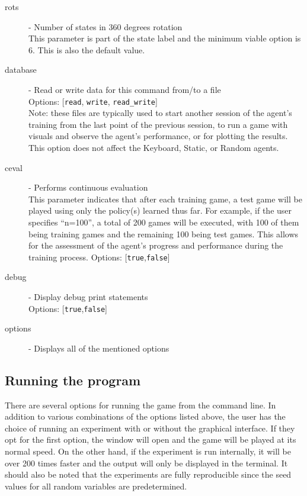 \begin{description}
\item[rots] - Number of states in 360 degrees rotation \label{opt:rots}\\
This parameter is part of the state label and the minimum viable option is 6. This is also the default value.
\item[database] - Read or write data for this command from/to a file \label{opt:database}\\
Options: [\texttt{read}, \texttt{write}, \texttt{read\_write}]\\
Note: these files are typically used to start another session of the agent's training from the last point of the previous session, to run a game with visuals and observe the agent's performance, or for plotting the results. This option does not affect the Keyboard, Static, or Random agents.
\item[ceval] - Performs continuous evaluation \label{opt:ceval}\\
This parameter indicates that after each training game, a test game will be played using only the policy(s) learned thus far. For example, if the user specifies ``n=100'', a total of 200 games will be executed, with 100 of them being training games and the remaining 100 being test games. This allows for the assessment of the agent's progress and performance during the training process. 
Options: [\texttt{true},\texttt{false}]
\item[debug] - Display debug print statements \label{opt:debug}\\
Options: [\texttt{true},\texttt{false}]
\item[options] - Displays all of the mentioned options \label{opt:options}\\
\end{description}

\subsection{Running the program}
There are several options for running the game from the command line. In addition to various combinations of the options listed above, the user has the choice of running an experiment with or without the graphical interface. If they opt for the first option, the window will open and the game will be played at its normal speed. On the other hand, if the experiment is run internally, it will be over 200 times faster and the output will only be displayed in the terminal.
It should also be noted that the experiments are fully reproducible since the seed values for all random variables are predetermined.

